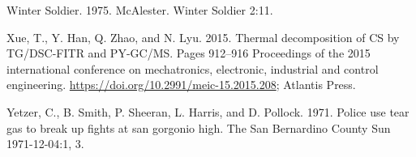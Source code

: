 \documentclass[
  11pt,
]{krantz}
\newlength{\cslhangindent}
\newlength{\cslentryspacingunit} %
\newenvironment{CSLReferences}[2] %
 {%
  \setlength{\parindent}{0pt}
  \ifodd #1
  \let\oldpar\par
  \def\par{\hangindent=\cslhangindent\oldpar}
  \fi
  \setlength{\parskip}{#2\cslentryspacingunit}
 }%
 {}
\begin{document}
\begin{CSLReferences}{1}{0}
\leavevmode{}%
Winter Soldier. 1975. McAlester. Winter Soldier 2:11.

\leavevmode{}%
Xue, T., Y. Han, Q. Zhao, and N. Lyu. 2015. Thermal decomposition of CS by TG/DSC-FITR and PY-GC/MS. Pages 912--916 Proceedings of the 2015 international conference on mechatronics, electronic, industrial and control engineering. \url{https://doi.org/10.2991/meic-15.2015.208}; Atlantis Press.

\leavevmode{}%
Yetzer, C., B. Smith, P. Sheeran, L. Harris, and D. Pollock. 1971. Police use tear gas to break up fights at san gorgonio high. The San Bernardino County Sun 1971-12-04:1, 3.

\end{CSLReferences}

\printindex
\end{document}
